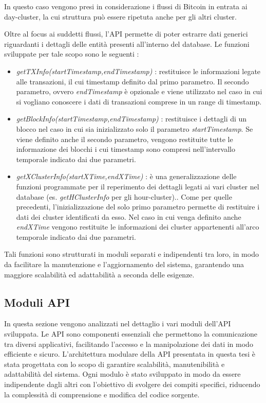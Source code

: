 In questo caso vengono presi in considerazione i flussi di Bitcoin in entrata ai day-cluster, la cui struttura può essere ripetuta anche per gli altri cluster.

Oltre al focus ai suddetti flussi, l'API permette di poter estrarre dati generici riguardanti i dettagli delle entità presenti all'interno del database. Le funzioni sviluppate per tale scopo sono le seguenti : 

\begin{itemize}
    \item \emph{getTXInfo(startTimestamp,endTimestamp)} : restituisce le informazioni legate alle transazioni, il cui timestamp definito dal primo parametro.
    Il secondo parametro, ovvero \emph{endTimestamp} è opzionale e viene utilizzato nel caso in cui si vogliano conoscere i dati di transazioni comprese in un range di timestamp.

    \item \emph{getBlockInfo(startTimestamp,endTimestamp)} :
    restituisce i dettagli di un blocco nel caso in cui sia inizializzato solo il parametro \emph{startTimestamp}.
    Se viene definito anche il secondo parametro, vengono restituite tutte le informazione dei blocchi i cui timestamp sono compresi nell'intervallo temporale indicato dai due parametri.
    \item \emph{getXClusterInfo(startXTime,endXTime)} : è una generalizzazione delle funzioni programmate per il reperimento dei dettagli legati ai vari cluster nel database (es. \emph{getHClusterInfo} per gli hour-cluster)..
    Come per quelle precedenti, l'inizializzazione del solo primo parametro  permette di restituire i dati dei cluster identificati da esso.
    Nel caso in cui venga definito anche \emph{endXTime} vengono restituite le informazioni dei cluster appartenenti all'arco temporale indicato dai due parametri.
\end{itemize}
\thispagestyle{mystyle}
Tali funzioni sono strutturati in moduli separati e indipendenti tra loro, in modo da facilitare la manutenzione e l'aggiornamento del sistema, garantendo una maggiore scalabilità ed adattabilità a seconda delle esigenze.


\subsection{Moduli API}
In questa sezione vengono analizzati nel dettaglio i vari moduli dell'API sviluppata.
Le API sono componenti essenziali che permettono la comunicazione tra diversi applicativi, facilitando l'accesso e la manipolazione dei dati in modo efficiente e sicuro.
L'architettura modulare della API presentata in questa tesi è stata progettata con lo scopo di garantire scalabilità, manutenibilità e adattabilità del sistema.
Ogni modulo è stato sviluppato in modo da essere indipendente dagli altri con l'obiettivo di svolgere dei compiti specifici, riducendo la complessità di comprensione e modifica del codice sorgente.

